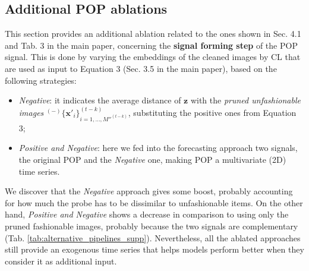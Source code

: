 \documentclass[runningheads]{llncs}
\newcommand{\snamebig}[0] {POP\xspace}
\begin{document}
\subsection{Additional POP ablations}\label{sec:ablations}
This section provides an additional ablation related to the ones shown in Sec. 4.1 and Tab. 3 in the main paper, concerning the \textbf{signal forming step} of the \snamebig signal. This is done by varying the embeddings of the cleaned images by CL that are used as input to Equation 3 (Sec. 3.5 in the main paper), based on the following strategies: 
\begin{itemize}[noitemsep, leftmargin=*]
    \item{\emph{Negative}}: it indicates the average distance of $\mathbf{z}$ with the \emph{pruned unfashionable images} ${}^{(-)}\{\mathbf{x}'_{i}\}_{i=1,\ldots,M''^{(t-k)}}^{(t-k)}$, substituting the positive ones from Equation 3;
    \item{\emph{Positive and Negative}}: here we fed into the forecasting approach two signals, the original POP and the \emph{Negative} one, making POP a multivariate (2D) time series.
\end{itemize}
We discover that the \emph{Negative} approach gives some boost, probably accounting for how much the probe has to be dissimilar to unfashionable items. On the other hand, \emph{Positive and Negative} shows a decrease in comparison to using only the pruned fashionable images, probably because the two signals are complementary (Tab. \ref{tab:alternative_pipelines_supp}). Nevertheless, all the ablated approaches still provide an exogenous time series that helps models perform better when they consider it as additional input.
\begin{table}[h]
\scriptsize
    \centering
    \caption{ Alternative versions of the signal forming step, comparing to the one proposed in Sec. 3.5, represented here as \snamebig, on both the \emph{first order setup} and \emph{release setup} of VISUELLE. Lower is better for both metrics.}
    \setlength\extrarowheight{1pt}
    
    \label{tab:alternative_pipelines_supp}
\end{table}
\end{document}

